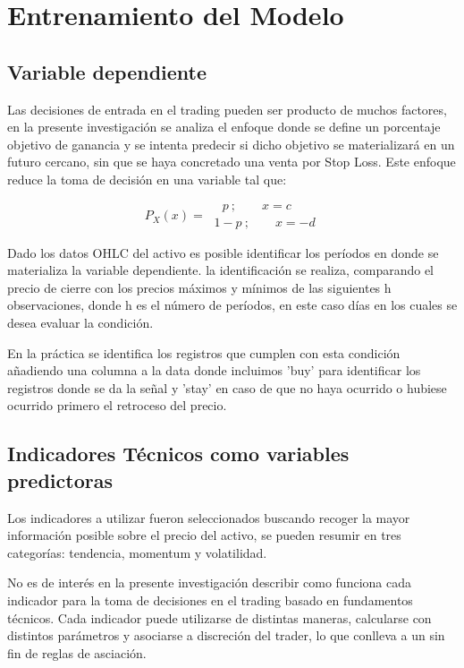 \documentclass[a4paper,12pt]{Latex/Classes/PhDthesisPSnPDF}
\begin{document}
\section{Entrenamiento del Modelo}

\subsection{Variable dependiente}

Las decisiones de entrada en el trading pueden ser producto de muchos factores, en la presente investigación se analiza el enfoque donde se define un porcentaje objetivo de ganancia y se intenta predecir si dicho objetivo se materializará en un futuro cercano, sin que se haya concretado una venta por Stop Loss. Este enfoque reduce la toma de decisión en una variable tal que:

$$
P_{X}(x) = 
\begin{array}{ll} 
\ \ \ \ p \ ; \qquad x = c
\\
\ 1-p \ ; \qquad x = -d
\end{array}
$$

Dado los datos OHLC del activo es posible identificar los períodos en donde se materializa la variable dependiente. la identificación se realiza, comparando el precio de cierre con los precios máximos y mínimos de las siguientes h observaciones, donde h es el número de períodos, en este caso días en los cuales se desea evaluar la condición.

En la práctica se identifica los registros que cumplen con esta condición añadiendo una columna a la data donde incluimos 'buy' para identificar los registros donde se da la señal y 'stay' en caso de que no haya ocurrido o hubiese ocurrido primero el retroceso del precio.

\subsection{Indicadores Técnicos como variables predictoras}

Los indicadores a utilizar fueron seleccionados buscando recoger la mayor información posible sobre el precio del activo, se pueden resumir en tres categorías: tendencia, momentum y volatilidad.

No es de interés en la presente investigación describir como funciona cada indicador para la toma de decisiones en el trading basado en fundamentos técnicos. Cada indicador puede utilizarse de distintas maneras, calcularse con distintos parámetros y asociarse a discreción del trader, lo que conlleva a un sin fin de reglas de asciación. 
\end{document}
